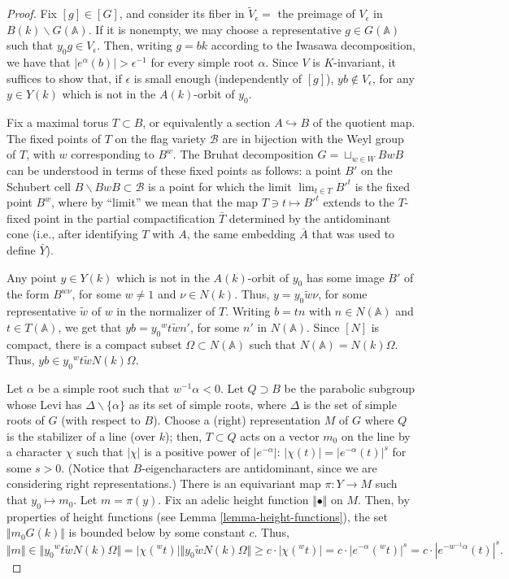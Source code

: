 \begin{proof}
 
 Fix $[g]\in [G]$, and consider its fiber in $\tilde V_\epsilon=$ the preimage of $V_\epsilon$ in $B(k)\backslash G(\mathbb A)$. If it is nonempty, we may choose a representative $g\in G(\mathbb A)$ such that $y_0 g \in V_\epsilon$. Then, writing $g = bk$ according to the Iwasawa decomposition, we have that $|e^\alpha(b)|>\epsilon^{-1}$ for every simple root $\alpha$. Since $V$ is $K$-invariant, it suffices to show that, if $\epsilon$ is small enough (independently of $[g]$), $y b \notin V_\epsilon$, for any $y\in Y(k)$ which is not in the $A(k)$-orbit of $y_0$. 
 
Fix a maximal torus $T\subset B$, or equivalently a section $A\hookrightarrow B$ of the quotient map. 
The fixed points of $T$ on the flag variety $\mathcal B$ are in bijection with the Weyl group of $T$, with $w$ corresponding to $B^w$. The Bruhat decomposition $G = \sqcup_{w\in W} BwB$ can be understood in terms of these fixed points as follows: a point $B'$ on the Schubert cell $B\backslash BwB\subset \mathcal B$ is a point for which the limit $\lim_{t\in T} B'^t$ is the fixed point $B^w$, where by ``limit'' we mean that the map $T\ni t \mapsto B'^t$ extends to the $T$-fixed point in the partial compactification $\bar T$ determined by the antidominant cone (i.e., after identifying $T$ with $A$, the same embedding $\bar A$ that was used to define $\bar Y$). 

Any point $y\in Y(k)$ which is not in the $A(k)$-orbit of $y_0$ has some image $B'$ of the form $B^{w \nu}$, for some $w\ne 1$ and $\nu \in N(k)$. Thus, $y = y_0 \tilde w \nu$, for some representative $\tilde w$ of $w$ in the normalizer of $T$. Writing $b=tn$ with $n\in N(\mathbb A)$ and $t\in T(\mathbb A)$, we get that $yb = y_0 {^wt} \tilde w n'$, for some $n'$ in $N(\mathbb A)$. Since $[N]$ is compact, there is a compact subset $\Omega\subset N(\mathbb A)$ such that $N(\mathbb A) = N(k) \Omega$. Thus, $yb \in y_0 {^wt} \tilde w N(k)\Omega$. 


Let $\alpha$ be a simple root such that $w^{-1}\alpha<0$. Let $Q\supset B$ be the parabolic subgroup whose Levi has $\Delta\smallsetminus\{\alpha\}$ as its set of simple roots, where $\Delta$ is the set of simple roots of $G$ (with respect to $B$). Choose a (right) representation $M$ of $G$ where $Q$ is the stabilizer of a line (over $k$); then, $T\subset Q$ acts on a vector $m_0$ on the line by a character $\chi$ such that $|\chi|$ is a positive power of $|e^{-\alpha}|$: $|\chi(t)| = |e^{-\alpha}(t)|^s$ for some $s>0$. (Notice that $B$-eigencharacters are antidominant, since we are considering right representations.) There is an equivariant map $\pi:Y\to M$ such that $y_0 \mapsto m_0$. Let $m = \pi(y)$. Fix an adelic height function $\Vert \bullet \Vert$ on $M$. Then, by properties of height functions (see Lemma \ref{lemma-height-functions}), the set $\Vert m_0 G(k)\Vert$ is bounded below by some constant $c$. Thus, 
$$\Vert m \Vert \in \Vert y_0 {^wt} \tilde w N(k)\Omega\Vert = |\chi({^wt})| \Vert y_0  \tilde w N(k)\Omega\Vert  \ge  c\cdot |\chi({^wt})| = c \cdot |e^{-\alpha}({^wt})|^s = c \cdot |e^{-w^{-1}\alpha}(t)|^s.$$


\end{proof}
